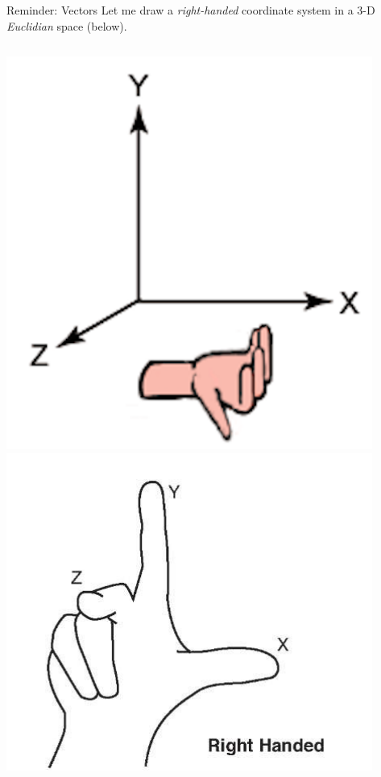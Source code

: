 {\begin{frame}{Reminder: Vectors}
{\small
Let me draw a {\em right-handed} coordinate system in a 3-D {\em Euclidian} space (below).\\
}
\begin{columns}
  \begin{column}{0.30\textwidth}
   \begin{center}
     \includegraphics[width=0.90\textwidth]{./images/schematics/right_handed_coordinate_system_1.png}\\
     \vspace{0.3cm}
     \includegraphics[width=0.90\textwidth]{./images/schematics/right_hand_rule_xyz.png}\\

\end{center}
\end{column}
\end{columns}
\end{frame}}
